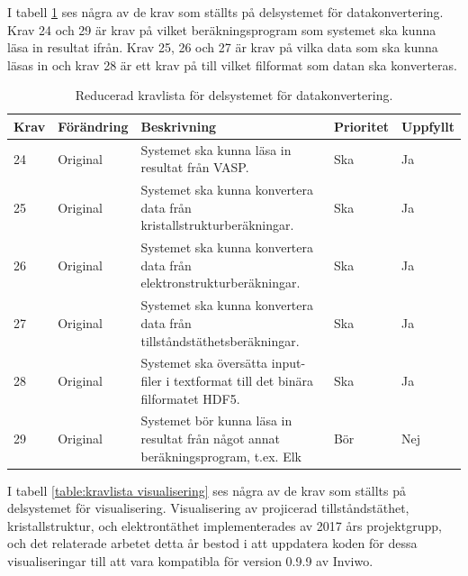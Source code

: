\documentclass[a4paper,12pt]{article}
\begin{document}
I tabell \ref{table:kravlista datakonvertering} ses några av de krav som ställts på delsystemet för datakonvertering. Krav 24 och 29 är krav på vilket beräkningsprogram som systemet ska kunna läsa in resultat ifrån. Krav 25, 26 och 27 är krav på vilka data som ska kunna läsas in och krav 28 är ett krav på till vilket filformat som datan ska konverteras. 
\begin{table}[H]
\caption{Reducerad kravlista för delsystemet för datakonvertering.}
\begin{center}
\begin{tabular}{ |p{10mm}|p{20mm}|p{70mm}|p{15mm}|p{15mm}|}
\hline
 \textbf{Krav} & \textbf{Förändring} & \textbf{Beskrivning} & \textbf{Prioritet} & \textbf{Uppfyllt}  \\ 
\hline
24 & Original & Systemet ska kunna läsa in resultat från VASP. & Ska & Ja \\
\hline
25 & Original & Systemet ska kunna konvertera data från kristallstrukturberäkningar. & Ska & Ja \\
\hline
26 & Original & Systemet ska kunna konvertera data från elektronstrukturberäkningar. & Ska & Ja \\
\hline
27 & Original & Systemet ska kunna konvertera data från tillståndstäthetsberäkningar. & Ska & Ja \\
\hline
28 & Original & Systemet ska översätta input-filer i textformat till det binära filformatet HDF5. & Ska & Ja \\
\hline
29 & Original & Systemet bör kunna läsa in resultat från något annat beräkningsprogram, t.ex. Elk & Bör & Nej \\
\hline
\end{tabular}
\label{table:kravlista datakonvertering}
\end{center}
\end{table}


I tabell \ref{table:kravlista visualisering} ses några av de krav som ställts på delsystemet för visualisering. Visualisering av projicerad tillståndstäthet, kristallstruktur, och elektrontäthet implementerades av 2017 års projektgrupp, och det relaterade arbetet detta år bestod i att uppdatera koden för dessa visualiseringar till att vara kompatibla för version 0.9.9 av Inviwo. 
\end{document}
